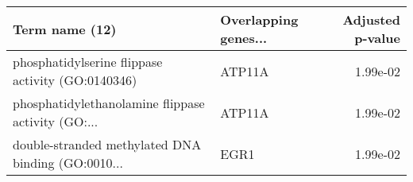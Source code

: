 \begin{tabular}{llr}
\toprule
                                    Term name (12) & Overlapping genes... &  Adjusted p-value \\
\midrule
 phosphatidylserine flippase activity (GO:0140346) &               ATP11A &          1.99e-02 \\
phosphatidylethanolamine flippase activity (GO:... &               ATP11A &          1.99e-02 \\
double-stranded methylated DNA binding (GO:0010... &                 EGR1 &          1.99e-02 \\
\bottomrule
\end{tabular}
